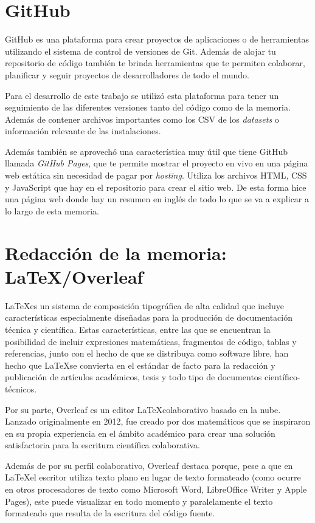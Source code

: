 \documentclass[a4paper, 12pt]{book}
\begin{document}
\section{GitHub}
\label{sec:github}

GitHub es una plataforma para crear proyectos de aplicaciones o de herramientas utilizando el sistema de control de versiones de Git. Además de alojar tu repositorio de código también te brinda herramientas que te permiten colaborar, planificar y seguir proyectos de desarrolladores de todo el mundo.

Para el desarrollo de este trabajo se utilizó esta plataforma para tener un seguimiento de las diferentes versiones tanto del código como de la memoria. Además de contener archivos importantes como los CSV de los \textit{datasets} o información relevante de las instalaciones.

Además también se aprovechó una característica muy útil que tiene GitHub llamada \textit{GitHub Pages}, que te permite mostrar el proyecto en vivo en una página web estática sin necesidad de pagar por \textit{hosting}. Utiliza los archivos HTML, CSS y JavaScript que hay en el repositorio para crear el sitio web. De esta forma hice una página web donde hay un resumen en inglés de todo lo que se va a explicar a lo largo de esta memoria. 

\section{Redacción de la memoria: \LaTeX/Overleaf}
\label{sec:redaccion_de_la_memoria}

\LaTeX es un sistema de composición tipográfica de alta calidad que incluye características especialmente diseñadas para la producción de documentación técnica y científica. Estas características, entre las que se encuentran la posibilidad de incluir expresiones matemáticas, fragmentos de código, tablas y referencias, junto con el hecho de que se distribuya como software libre, han hecho que \LaTeX se convierta en el estándar de facto para la redacción y publicación de artículos académicos, tesis y todo tipo de documentos científico-técnicos. 

Por su parte, Overleaf es un editor \LaTeX colaborativo basado en la nube. Lanzado originalmente en 2012, fue creado por dos matemáticos que se inspiraron en su propia experiencia en el ámbito académico para crear una solución satisfactoria para la escritura científica colaborativa.

Además de por su perfil colaborativo, Overleaf destaca porque, pese a que en \LaTeX el escritor utiliza texto plano en lugar de texto formateado (como ocurre en otros procesadores de texto como Microsoft Word, LibreOffice Writer y Apple Pages), este puede visualizar en todo momento y paralelamente el texto formateado que resulta de la escritura del código fuente.
\end{document}

